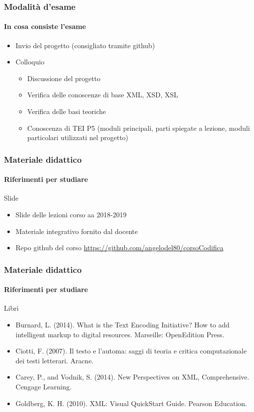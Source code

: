 \begin{frame}
	\frametitle{Modalità d’esame}
	\framesubtitle{In cosa consiste l'esame}
	\addtocounter{nframe}{1}

	\begin{itemize}
		\item Invio del progetto (consigliato tramite github)
		\item Colloquio
		      \begin{itemize}
			      \item Discussione del progetto
			      \item Verifica delle conoscenze di base XML, XSD, XSL
			      \item Verifica delle basi teoriche
			      \item Conoscenza di TEI P5 (moduli principali, parti spiegate a lezione, moduli particolari utilizzati nel progetto)
		      \end{itemize}
	\end{itemize}

\end{frame}

\begin{frame}
	\frametitle{Materiale didattico}
	\framesubtitle{Riferimenti per studiare}
	\addtocounter{nframe}{1}

	\begin{block}{Slide}
		\begin{itemize}
			\item Slide delle lezioni corso aa 2018-2019
			\item Materiale integrativo fornito dal docente
			\item Repo github del corso \href{https://github.com/angelodel80/corsoCodifica}{\url{https://github.com/angelodel80/corsoCodifica}}
		\end{itemize}
	\end{block}


\end{frame}

\begin{frame}
	\frametitle{Materiale didattico}
	\framesubtitle{Riferimenti per studiare}
	\addtocounter{nframe}{1}

	\begin{block}{Libri}
		\begin{itemize}
			\item Burnard, L. (2014). What is the Text Encoding Initiative? How to add intelligent markup to digital resources. Marseille: OpenEdition Press.
			\item Ciotti, F. (2007). Il testo e l’automa: saggi di teoria e critica computazionale dei testi letterari. Aracne.
			\item Carey, P., and Vodnik, S. (2014). New Perspectives on XML, Comprehensive. Cengage Learning.
			\item Goldberg, K. H. (2010). XML: Visual QuickStart Guide. Pearson Education.
		\end{itemize}

	\end{block}
\end{frame}

